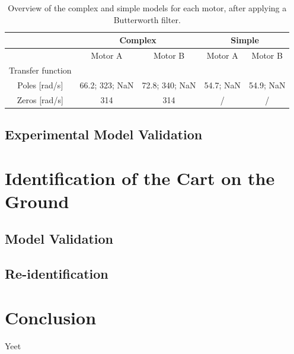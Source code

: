 \documentclass[a4paper,kul]{kulakarticle} %
\begin{document}
\begin{table}[htp]
	\centering
	\caption{Overview of the complex and simple models for each motor, after applying a Butterworth filter.}
	\label{tab:overview_BW}
	\bgroup
	\def\arraystretch{1.8}
	\begin{tabular}{|c||cc||cc|}
		\hline & \multicolumn{2}{c||}{\textbf{Complex}} & \multicolumn{2}{c|}{\textbf{Simple}} 
		\\ \hline \hline
		& \multicolumn{1}{c|}{Motor A} & Motor B & \multicolumn{1}{c|}{Motor A} & Motor B
		\\ \hline
		Transfer function & \multicolumn{1}{c|}{\scalebox{1.15}{$\frac{0.6952\text{ }z + 0.7978}{z^3 - 0.04632\text{ }z^2 - 0.242\text{ }z}$}} & \scalebox{1.15}{$\frac{0.6901\text{ }z + 0.6834}{z^3 - 0.2128\text{ }z^2 - 0.1303\text{ }z}$} & \multicolumn{1}{c|}{\scalebox{1.15}{$\frac{ 0.8842}{z^2 - 0.5787\text{ }z}$}} & \scalebox{1.15}{$\frac{0.8832}{z^2 - 0.5778\text{ }z}$} 
		\\ \hline
		Poles [rad/s] & \multicolumn{1}{c|}{66.2; 323; NaN} & 72.8; 340; NaN & \multicolumn{1}{c|}{54.7; NaN} & 54.9; NaN
		\\ \hline
		Zeros [rad/s] & \multicolumn{1}{c|}{314} & 314 & \multicolumn{1}{c|}{/} & /
		\\ \hline
	\end{tabular}
	\egroup
\end{table}





\subsection{Experimental Model Validation}


\section{Identification of the Cart on the Ground}


\subsection{Model Validation}


\subsection{Re-identification}












\section*{Conclusion}
Yeet
\end{document}
